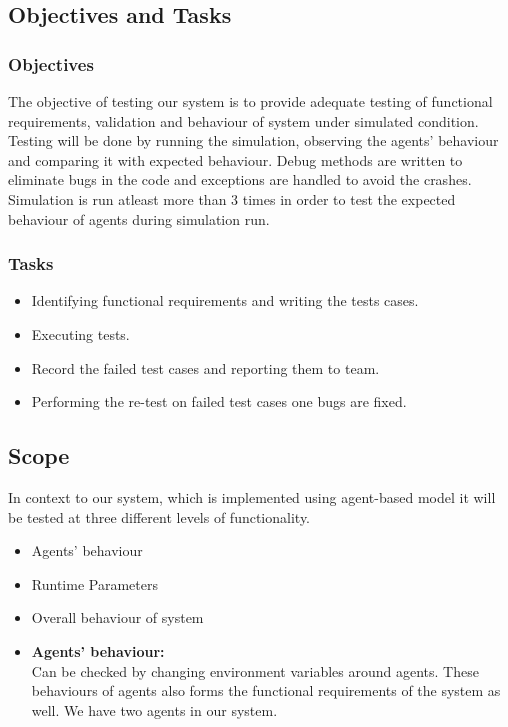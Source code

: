 \documentclass[11pt]{article}
\begin{document}
\begin{enumerate}
\subsection{Objectives and Tasks}
\subsubsection{Objectives}
    The objective of testing our system is to provide adequate testing of functional requirements, validation and behaviour of system under simulated condition. Testing will be done by running the simulation, observing the agents' behaviour and comparing it with expected behaviour. Debug methods are written to eliminate bugs in the code and exceptions are handled to avoid the crashes. Simulation is run atleast more than 3 times in order to test the expected behaviour of agents during simulation run.

\subsubsection{Tasks}
\begin{itemize}
	\item Identifying functional requirements and writing the tests cases.

	\item Executing tests.

	\item Record the failed test cases and reporting them to team.

	\item Performing the re-test on failed test cases one bugs are fixed.
\end{itemize}

\subsection{Scope}
	In context to our system, which is implemented using agent-based model it will be tested at three different levels of functionality.
		\begin{itemize}
			\item Agents' behaviour
			\item Runtime Parameters
			\item	 Overall behaviour of system
		\end{itemize} 

\begin{itemize}
	\subsubsection{Levels of Functionalities}
	\item \textbf{Agents' behaviour: }\hfill \\
	Can be checked by changing environment variables around agents. These behaviours of agents also forms the functional requirements of the system as well. We have two agents in our system. \begin{enumerate}


\end{enumerate}
\end{itemize}
\end{enumerate}
\end{document}
